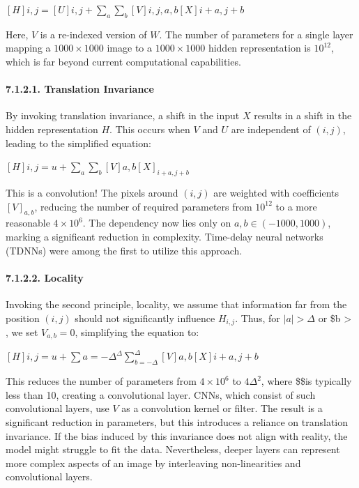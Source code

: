 \documentclass[11pt]{article}
\begin{document}
\([H]{i,j} = [U]{i,j} + \sum_a \sum_b [V]{i,j,a,b} [X]{i+a,j+b}\)

Here, \(V\) is a re-indexed version of \(W\). The number of parameters
for a single layer mapping a \(1000 × 1000\) image to a \(1000 × 1000\)
hidden representation is \(10^{12}\), which is far beyond current
computational capabilities.

    \paragraph{7.1.2.1. Translation
Invariance}\label{translation-invariance}

    By invoking translation invariance, a shift in the input \(X\) results
in a shift in the hidden representation \(H\). This occurs when \(V\)
and \(U\) are independent of \((i,j)\), leading to the simplified
equation:

\([H]{i,j} = u + \sum_a \sum_b [V]{a,b} [X]_{i+a,j+b}\)

This is a convolution! The pixels around \((i,j)\) are weighted with
coefficients \([V]_{a,b}\), reducing the number of required parameters
from \(10^{12}\) to a more reasonable \(4 \times 10^6\). The dependency
now lies only on \(a, b \in (-1000, 1000)\), marking a significant
reduction in complexity. Time-delay neural networks (TDNNs) were among
the first to utilize this approach.

    \paragraph{7.1.2.2. Locality}\label{locality}

    Invoking the second principle, locality, we assume that information far
from the position \((i, j)\) should not significantly influence
\(H_{i,j}\). Thus, for \(|a| > \Delta\) or \$\textbar b\textbar{}
\textgreater{} \Delta , we set \(V_{a,b} = 0\), simplifying the equation
to:

\([H]{i,j} = u + \sum{a=-\Delta}^{\Delta} \sum_{b=-\Delta}^{\Delta} [V]{a,b} [X]{i+a,j+b}\)

This reduces the number of parameters from \(4 \times 10^6\) to
\(4 \Delta^2\), where \$\Delta \$is typically less than 10, creating a
convolutional layer. CNNs, which consist of such convolutional layers,
use \(V\) as a convolution kernel or filter. The result is a significant
reduction in parameters, but this introduces a reliance on translation
invariance. If the bias induced by this invariance does not align with
reality, the model might struggle to fit the data. Nevertheless, deeper
layers can represent more complex aspects of an image by interleaving
non-linearities and convolutional layers.
\end{document}
